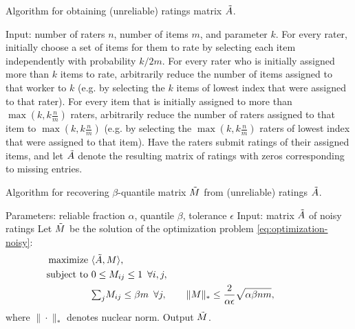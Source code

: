 \begin{algorithm}[b!]
\caption{Algorithm for obtaining (unreliable) ratings matrix $\tilde{A}$.}
\label{alg:create-A}
\begin{algorithmic}[1]
\State Input: number of raters $n$,  number of items $m$, and parameter $k$.
\State For every rater, initially choose a set of items for them to rate by selecting each item independently with probability $k/2m$.  
\State For every rater who is initially assigned more than $k$ items to rate, arbitrarily reduce the number of items assigned to that worker to $k$ (e.g. by selecting the $k$ items of lowest index that were assigned to that rater).
\State For every item that is initially assigned to more than $\max\left(k,k\frac{n}{m}\right)$ raters, arbitrarily reduce the number of raters assigned to that item to $\max\left(k, k \frac{n}{m}\right)$ (e.g. by selecting the $\max \left(k, k \frac{n}{m}\right)$ raters of lowest index that were assigned to that item).
\State Have the raters submit ratings of their assigned items, and let $\tilde{A}$ denote the resulting matrix of ratings with zeros corresponding to missing entries.
\end{algorithmic}
\end{algorithm}


\begin{algorithm}[b!]
\caption{Algorithm for recovering $\beta$-quantile matrix $\tilde{M}$ from 
(unreliable) ratings $\tilde{A}$.}
\label{alg:recover-M}
\begin{algorithmic}[1]
\State Parameters: reliable fraction $\alpha$, quantile $\beta$, tolerance $\epsilon$
\State Input: matrix $\tilde{A}$ of noisy ratings
\State Let $\tilde{M}$ be the solution of the optimization problem \eqref{eq:optimization-noisy}:
  \begin{align}
  \label{eq:optimization-noisy}
  \text{maximize } &\langle \tilde{A}, M \rangle, \\
  \notag \text{ subject to } &0 \leq M_{ij} \leq 1 \,\,\, \forall i,j, \\
  \notag                     &{\textstyle \sum_{j}} M_{ij} \leq \beta m \,\,\, \forall j, \quad\quad
                      \|M\|_* \leq \frac{2}{\alpha\epsilon}\sqrt{\alpha\beta nm}, \phantom{xxxxxxx}
  \end{align}
  where $\|\cdot\|_*$ denotes nuclear norm.
\State Output $\tilde{M}$.
\end{algorithmic}
\end{algorithm}
